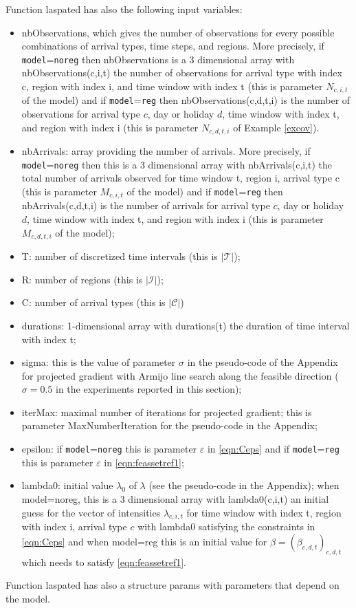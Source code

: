 \documentclass[article]{jss}
\begin{document}
{Function laspated has also the following input variables:
\begin{itemize}
\item nbObservations, which gives the number of observations
for every possible combinations of arrival types, time steps,
and regions. More precisely, if {\tt{model}}={\tt{noreg}} then
nbObservations is a 3 dimensional array with nbObservations(c,i,t) the number
of observations for 
arrival type with index c, region with index i, and
time window with index t
(this is parameter $N_{c,i,t}$ of the model)
and if {\tt{model}}={\tt{reg}} then nbObservations(c,d,t,i) is the number
of observations for arrival type $c$, day or holiday $d$,
time window with index t, and region with index i (this is parameter
$N_{c,d,t,i}$ of Example \ref{excov}).
\item nbArrivals: array providing the number of arrivals.
More precisely,  if {\tt{model}}={\tt{noreg}} then
this is a 3 dimensional array with nbArrivals(c,i,t)
the total number of arrivals observed for time window t,
region i, arrival type c (this is parameter $M_{c,i,t}$ of the model)
and if {\tt{model}}={\tt{reg}} then 
nbArrivals(c,d,t,i) is the number
of arrivals for arrival type $c$, day or holiday $d$,
time window with index t, and region with index i
(this is parameter $M_{c,d,t,i}$ of the model);
\item T: number of discretized time intervals (this is $|\mathcal{T}|$);
\item R: number of regions (this is $|\mathcal{I}|$);
\item C: number of arrival types (this is $|\mathcal{C}|$)
\item durations: 1-dimensional array with durations(t) the duration
of time interval with index t;
\item sigma: this is the value of parameter $\sigma$
in the pseudo-code of the Appendix for projected gradient with Armijo line search along the feasible
direction ($\sigma=0.5$ in the experiments reported in this section);
\item iterMax: maximal number of iterations for projected gradient; this is parameter MaxNumberIteration for the pseudo-code in the Appendix;
\item epsilon: if {\tt{model}}={\tt{noreg}} this is parameter $\varepsilon$ in \eqref{eqn:Ceps}
and if {\tt{model}}={\tt{reg}}
this is parameter 
$\varepsilon$ in
\eqref{eqn:feassetref1};
\item lambda0: initial value $\lambda_{0}$ of $\lambda$ (see the pseudo-code in the Appendix); when
 model=noreg, this is a 3 dimensional array with lambda0(c,i,t) an
initial guess for the vector of intensities 
$\lambda_{c,i,t}$ for 
 time window with index t, region with index i, arrival type $c$ with lambda0 satisfying the constraints in \eqref{eqn:Ceps}  and
 when model=reg
 this is an initial value for $\beta=(\beta_{c,d,t})_{c,d,t}$
which needs to satisfy \eqref{eqn:feassetref1}.
\end{itemize}
Function laspated has also a structure params with parameters
that depend on the model. 

}
\end{document}
